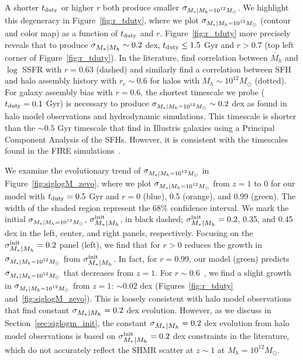 \documentclass[12pt, letterpaper, preprint, tighten]{aastex62}
\newcommand{\tduty}{t_{\rm duty}}
\newcommand{\siglogm}{\sigma_{\scaleto{M_*|M_h}{8pt}}}
\newcommand{\sigtwe}{\sigma_{\scaleto{M_*|M_h=10^{12}M_\odot}{8pt}}}
\begin{document}
A shorter $t_{\rm duty}$ or higher $r$ both produce smaller $\sigtwe$. 
We highlight this degeneracy in Figure~\ref{fig:r_tduty}, where we plot 
$\sigtwe$ (contour and color map) as a function of $t_{\rm duty}$ and $r$. 
Figure~\ref{fig:r_tduty} more precisely reveals that to produce 
$\siglogm \sim 0.2$ dex, $\tduty \leq 1.5$ Gyr and 
$r > 0.7$ (top left corner of Figure~\ref{fig:r_tduty}). 
In the literature, \cite{tinker2018b} find correlation
between $\dot{M_h}$ and $\log$ SSFR with $r = 0.63$ (dashed) and
\cite{behroozi2019} similarly find a correlation between SFH and halo
assembly history with $r_c \sim 0.6$ for halos with $M_h \sim 10^{12}M_\odot$
(dotted). For galaxy assembly bias with $r = 0.6$, the shortest timescale 
we probe ($t_{\rm duty} = 0.1$ Gyr) is necessary to produce 
$\sigtwe \sim 0.2$ dex as found in halo model observations and hydrodynamic 
simulations. This timescale is shorter than the $\sim 0.5$ Gyr timescale that \cite{sparre2015} 
find in Illustris galaxies using a Principal Component Analysis of the SFHs. 
However, it is consistent with the timescales found in the FIRE 
simulations~\citep{hopkins2014, sparre2017}.

We examine the evolutionary trend of $\sigtwe$ in Figure~\ref{fig:siglogM_zevo}, 
where we plot $\sigtwe$ from $z=1$ to 0 for our model with $t_{\rm duty} = 0.5$ Gyr 
and $r = 0$ (blue), 0.5 (orange), and 0.99 (green). The width of the shaded 
region represent the $68\%$ confidence interval. We mark the
initial $\sigtwe$, $\siglogm^{\rm init}$, in black dashed; 
$\siglogm^{\rm init} = 0.2$, 0.35, and 0.45 dex in the left, center, and right 
panels, respectively. Focusing on the $\siglogm^{\rm init} = 0.2$ panel (left),
we find that for $r > 0$ reduces the growth in $\sigtwe$ from $\siglogm^{\rm init}$. 
In fact, for $r = 0.99$, our model (green) predicts $\sigtwe$ that decreases 
from $z=1$. For $r \sim 0.6$~\citep{behroozi2019,tinker2018b}, 
we find a slight growth in $\sigtwe$ from $z=1$: $\sim0.02$ dex (Figures~\ref{fig:r_tduty} 
and~\ref{fig:siglogM_zevo}). This is loosely consistent with halo model observations 
that find constant $\siglogm = 0.2$ dex evolution. However, as we 
discuss in Section~\ref{sec:siglogm_init}, the constant $\siglogm = 0.2$ dex 
evolution from halo model observations is based on $\siglogm^{\rm init} = 0.2$ dex 
constraints in the literature, which do not accurately reflect the SHMR scatter 
at $z \sim 1$ at $M_h = 10^{12}M_\odot$. 
\end{document}
